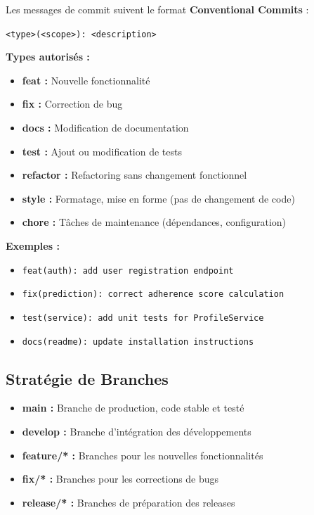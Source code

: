 \documentclass[12pt,a4paper]{report}
\begin{document}
Les messages de commit suivent le format \textbf{Conventional Commits} :

\texttt{<type>(<scope>): <description>}

\textbf{Types autorisés :}
\begin{itemize}
    \item \textbf{feat :} Nouvelle fonctionnalité
    \item \textbf{fix :} Correction de bug
    \item \textbf{docs :} Modification de documentation
    \item \textbf{test :} Ajout ou modification de tests
    \item \textbf{refactor :} Refactoring sans changement fonctionnel
    \item \textbf{style :} Formatage, mise en forme (pas de changement de code)
    \item \textbf{chore :} Tâches de maintenance (dépendances, configuration)
\end{itemize}

\textbf{Exemples :}
\begin{itemize}
    \item \texttt{feat(auth): add user registration endpoint}
    \item \texttt{fix(prediction): correct adherence score calculation}
    \item \texttt{test(service): add unit tests for ProfileService}
    \item \texttt{docs(readme): update installation instructions}
\end{itemize}

\subsection{Stratégie de Branches}

\begin{itemize}
    \item \textbf{main :} Branche de production, code stable et testé
    \item \textbf{develop :} Branche d'intégration des développements
    \item \textbf{feature/* :} Branches pour les nouvelles fonctionnalités
    \item \textbf{fix/* :} Branches pour les corrections de bugs
    \item \textbf{release/* :} Branches de préparation des releases
\end{itemize}
\end{document}
